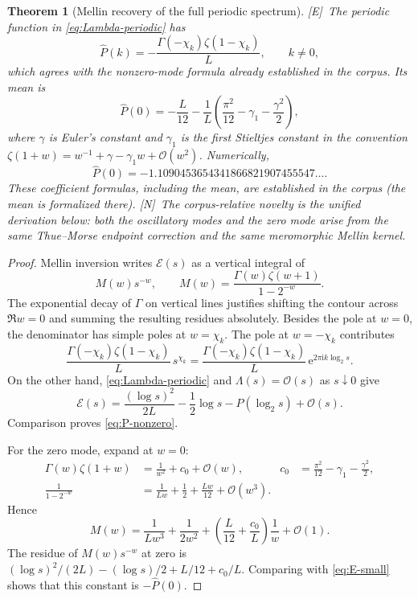\documentclass[11pt,oneside]{article}
\newtheorem{theorem}{Theorem}[section]
\theoremstyle{definition}
\theoremstyle{remark}
\newcommand{\e}{\mathrm e}
\newcommand{\ii}{\mathrm i}
\newcommand{\bigO}{\mathcal O}
\newcommand{\statusE}{\textsf{[E]}}
\newcommand{\statusN}{\textsf{[N]}}
\begin{document}
\begin{theorem}[Mellin recovery of the full periodic spectrum]\label{thm:P-Fourier}
\statusE\ The periodic function in \eqref{eq:Lambda-periodic} has
\begin{equation}
 \boxed{
 \widehat P(k)=-\frac{\Gamma(-\chi_k)\zeta(1-\chi_k)}L,
 \qquad k\ne0,}                                           \label{eq:P-nonzero}
\end{equation}
which agrees with the nonzero-mode formula already established in the corpus.  Its mean is
\begin{equation}
 \boxed{
 \widehat P(0)
 =-\frac L{12}
 -\frac1L\left(\frac{\pi^2}{12}-\gamma_1-\frac{\gamma^2}{2}\right),} \label{eq:P-mean}
\end{equation}
where $\gamma$ is Euler's constant and $\gamma_1$ is the first Stieltjes constant in the
convention
$\zeta(1+w)=w^{-1}+\gamma-\gamma_1w+\bigO(w^2)$.
Numerically,
\begin{equation}
 \widehat P(0)=-1.1090453654341866821907455547\ldots.       \label{eq:P-mean-num}
\end{equation}
These coefficient formulas, including the mean, are established in the corpus (the mean is
formalized there).  \statusN\ The corpus-relative novelty is the unified derivation below:
both the oscillatory modes and the zero mode arise from the same Thue--Morse endpoint
correction and the same meromorphic Mellin kernel.
\end{theorem}

\begin{proof}
Mellin inversion writes $\mathcal E(s)$ as a vertical integral of
\[
 M(w)s^{-w},\qquad M(w)=\frac{\Gamma(w)\zeta(w+1)}{1-2^{-w}}.
\]
The exponential decay of $\Gamma$ on vertical lines justifies shifting the contour across
$\Re w=0$ and summing the resulting residues absolutely.  Besides the pole at $w=0$, the
denominator has simple poles at $w=\chi_k$.
The pole at $w=-\chi_k$ contributes
\[
 \frac{\Gamma(-\chi_k)\zeta(1-\chi_k)}L\,s^{\chi_k}
 =\frac{\Gamma(-\chi_k)\zeta(1-\chi_k)}L\,\e^{2\pi\ii k\log_2s}.
\]
On the other hand, \eqref{eq:Lambda-periodic} and $\Lambda(s)=\bigO(s)$ as $s\downarrow0$
give
\begin{equation}
 \mathcal E(s)=\frac{(\log s)^2}{2L}-\frac12\log s
 -P(\log_2s)+\bigO(s).                                    \label{eq:E-small}
\end{equation}
Comparison proves \eqref{eq:P-nonzero}.

For the zero mode, expand at $w=0$:
\begin{align*}
 \Gamma(w)\zeta(1+w)
 &=\frac1{w^2}+c_0+\bigO(w),
 &c_0&=\frac{\pi^2}{12}-\gamma_1-\frac{\gamma^2}{2},\\
 \frac1{1-2^{-w}}
 &=\frac1{Lw}+\frac12+\frac{Lw}{12}+\bigO(w^3).
\end{align*}
Hence
\[
 M(w)=\frac1{Lw^3}+\frac1{2w^2}
 +\left(\frac L{12}+\frac{c_0}L\right)\frac1w+\bigO(1).
\]
The residue of $M(w)s^{-w}$ at zero is
$(\log s)^2/(2L)-(\log s)/2+L/12+c_0/L$.  Comparing with
\eqref{eq:E-small} shows that this constant is $-\widehat P(0)$.
\end{proof}
\end{document}
